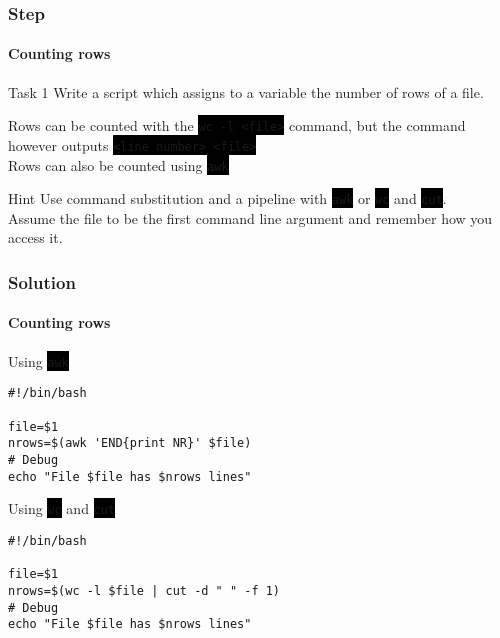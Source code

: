 \documentclass[unknownkeysallowed, 10pt, a4 paper, handout]{beamer}
\newcommand{\code}[1]{\colorbox{black}{\color{green}\texttt{#1}}}
\begin{document}
\begin{frame}
  \frametitle{Step}
  \framesubtitle{Counting rows}

  \begin{exampleblock}{Task 1}
    Write a script which assigns to a variable the number of rows of a file.
  \end{exampleblock}

  \begin{block}{}
    Rows can be counted with the \code{wc -l <file>} command, but
    the command however outputs \code{<line number> <file>}\\
    Rows can also be counted using \code{awk}
  \end{block}

  \begin{alertblock}{Hint}
    Use command substitution and a pipeline with \code{awk} or 
    \code{wc} and \code{cut}. \\
    Assume the file to be the first command line argument and
    remember how you access it.
  \end{alertblock}
\end{frame}


\begin{frame}[fragile=singleslide]
  \frametitle{Solution}
  \framesubtitle{Counting rows}

  \begin{exampleblock}{Using \code{awk}}
    \begin{verbatim}
#!/bin/bash

file=$1
nrows=$(awk 'END{print NR}' $file)
# Debug
echo "File $file has $nrows lines"
    \end{verbatim}
  \end{exampleblock}

  \begin{exampleblock}{Using \code{wc} and \code{cut}}
    \begin{verbatim}
#!/bin/bash

file=$1
nrows=$(wc -l $file | cut -d " " -f 1)
# Debug
echo "File $file has $nrows lines"
    \end{verbatim}
  \end{exampleblock}
\end{frame}
\end{document}
